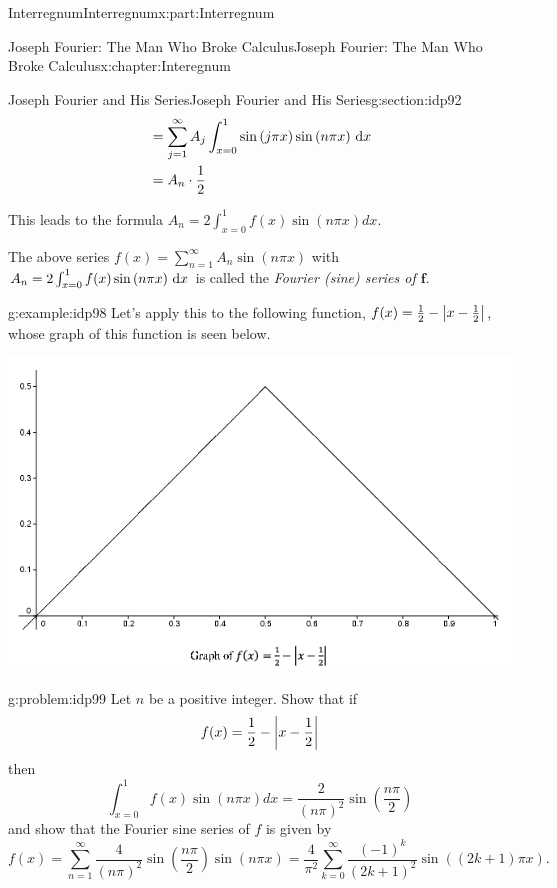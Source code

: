 \begin{partptx}{Interregnum}{}{Interregnum}{}{}{x:part:Interregnum}
\begin{chapterptx}{Joseph Fourier: The Man Who Broke Calculus}{}{Joseph Fourier: The Man Who Broke Calculus}{}{}{x:chapter:Interegnum}
\begin{sectionptx}{Joseph Fourier and His Series}{}{Joseph Fourier and His Series}{}{}{g:section:idp92}
\begin{align*}
				& =\sum_{j=1}^\infty A_j\int_{x=0}^1\sin\left(j\pi x\right)\sin\left(n\pi x\right)\,{\rm d} x\\
				& =A_n\cdot\frac{1}{2}
			\end{align*}
			\par
			This leads to the formula \(A_n=2\int_{x=0}^1f(x)\sin\left(n\pi x\right)d x\).%
			\par
			The above series \(f(x)=\sum_{n=1}^\infty A_n\sin\left(n\pi x\right)\) with \(A_n=2\int_{x=0}^1f(x)\sin\left(n\pi x\right)\,{\rm d} x\) is called the \emph{Fourier (sine) series of \(\boldsymbol{f}\)}.%
			\begin{example}{}{g:example:idp98}%
				Let's apply this to the following function, \(f(x)=\frac{1}{2}-\left|x-\frac{1}{2}\right|\), whose graph of this function is seen below.%
				\begin{image}{0.125}{0.75}{0.125}%
					\includegraphics[width=\linewidth]{external/images/FourierEx1.png}
				\end{image}%
			\end{example}
			\begin{problem}{}{g:problem:idp99}%
				 Let \(n\) be a positive integer. Show that if%
				\begin{equation*}
					f(x)=\frac{1}{2}-\left|x-\frac{1}{2}\right|
				\end{equation*}
				then%
				\begin{equation*}
					\int_{x=0}^1f(x)\sin\left(n\pi x\right)d x = \frac{2}{\left(n\pi\right)^2}\sin\left(\frac{n\pi}{2}\right)
				\end{equation*}
				and show that the Fourier sine series of \(f\) is given by%
				\begin{equation*}
					f(x)=\sum_{n=1}^\infty\frac{4}{\left(n\pi\right)^2}\sin\left(\frac{n\pi}{2} \right)\sin\left(n\pi x\right)=\frac{4}{\pi^2}\sum_{k=0}^\infty\frac{\left(-1\right)^k}{\left(2k+1\right)^2}\sin\left(\left(2k+1\right)\pi x\right).{}

\end{equation*}
\end{problem}
\end{sectionptx}
\end{chapterptx}
\end{partptx}
